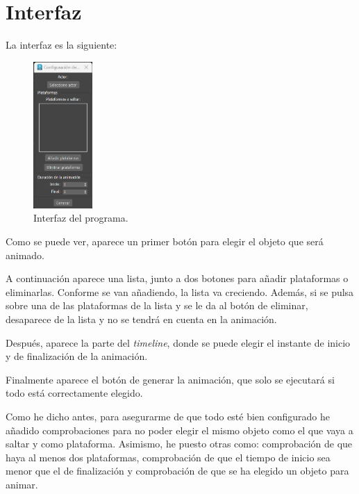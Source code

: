 \section{Interfaz}

La interfaz es la siguiente:

\begin{figure}[H]
   \centering
   \includegraphics[width=0.2\textwidth]{imagenes/ui1.png}
   \caption{Interfaz del programa.}
\end{figure}

Como se puede ver, aparece un primer botón para elegir el objeto que será animado.

\bigskip

A continuación aparece una lista, junto a dos botones para añadir plataformas o eliminarlas. Conforme se van añadiendo, la lista va creciendo. Además, si se pulsa sobre una de las plataformas de la lista y se le da al botón de eliminar, desaparece de la lista y no se tendrá en cuenta en la animación.

\bigskip

Después, aparece la parte del \textit{timeline}, donde se puede elegir el instante de inicio y de finalización de la animación.

\bigskip

Finalmente aparece el botón de generar la animación, que solo se ejecutará si todo está correctamente elegido.

\bigskip

Como he dicho antes, para asegurarme de que todo esté bien configurado he añadido comprobaciones para no poder elegir el mismo objeto como el que vaya a saltar y como plataforma. Asimismo, he puesto otras como: comprobación de que haya al menos dos plataformas, comprobación de que el tiempo de inicio sea menor que el de finalización y comprobación de que se ha elegido un objeto para animar.

